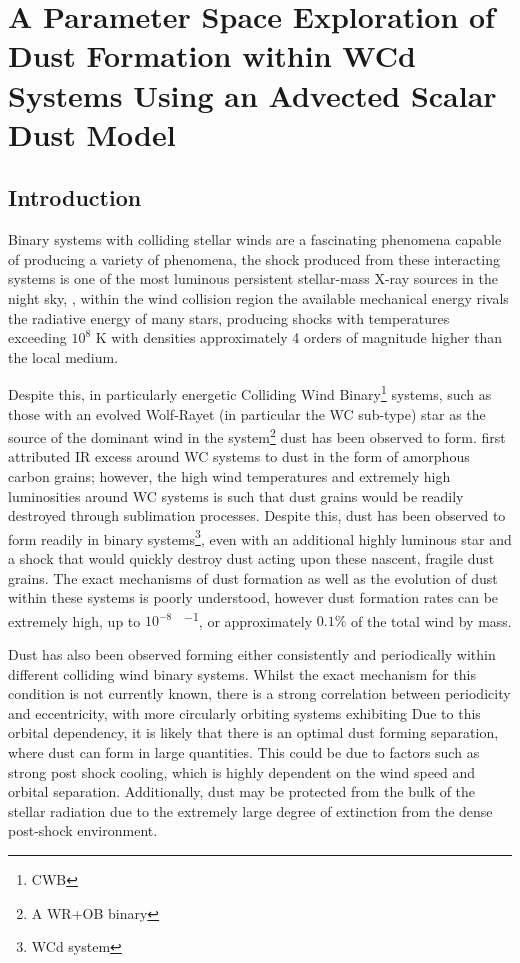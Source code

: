 \chapter[A Parameter Space Exploration of Dust Formation]{A Parameter Space Exploration of Dust Formation within WCd Systems Using an Advected Scalar Dust Model}


\begin{abstract}
    
\end{abstract}

\section{Introduction}


Binary systems with colliding stellar winds are a fascinating phenomena capable of producing a variety of phenomena, the shock produced from these interacting systems is one of the most luminous persistent stellar-mass X-ray sources in the night sky, 
\parencite{usov_stellar_1991}, within the wind collision region the available mechanical energy rivals the radiative energy of many stars, producing shocks with temperatures exceeding $10^8$ \si{\kelvin} with densities approximately 4 orders of magnitude higher than the local medium.

Despite this, in particularly energetic Colliding Wind Binary\footnote{CWB} systems, such as those with an evolved Wolf-Rayet (in particular the WC sub-type) star as the source of the dominant wind in the system\footnote{A WR+OB binary} dust has been observed to form.
\cite{allenInfraredPhotometryNorthern1972} first attributed IR excess around WC systems to dust in the form of amorphous carbon grains; however, the high wind temperatures and extremely high luminosities around WC systems is such that dust grains would be readily destroyed through sublimation processes.
Despite this, dust has been observed to form readily in binary systems\footnote{WCd system}, even with an additional highly luminous star and a shock that would quickly destroy dust acting upon these nascent, fragile dust grains.
The exact mechanisms of dust formation as well as the evolution of dust within these systems is poorly understood, however dust formation rates can be extremely high, up to $10^{-8}$ \si{\solarmass\per\year}, or approximately $0.1\%$ of the total wind by mass.


Dust has also been observed forming either consistently and periodically within different colliding wind binary systems.
Whilst the exact mechanism for this condition is not currently known, there is a strong correlation between periodicity and eccentricity, with more circularly orbiting systems exhibiting 
Due to this orbital dependency, it is likely that there is an optimal dust forming separation, where dust can form in large quantities. This could be due to factors such as strong post shock cooling, which is highly dependent on the wind speed and orbital separation.
Additionally, dust may be protected from the bulk of the stellar radiation due to the extremely large degree of extinction from the dense post-shock environment.

